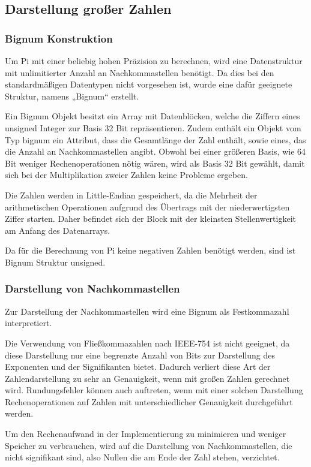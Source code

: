 \documentclass[course=erap]{aspdoc}
\begin{document}
\subsection{Darstellung großer Zahlen}
\subsubsection{Bignum Konstruktion}
Um Pi mit einer beliebig hohen Präzision zu berechnen, wird eine Datenstruktur mit unlimitierter Anzahl an Nachkommastellen benötigt. Da dies bei den standardmäßigen Datentypen nicht vorgesehen ist, wurde eine dafür geeignete Struktur, namens „Bignum“ erstellt.

Ein Bignum Objekt besitzt ein Array mit Datenblöcken, welche die Ziffern eines unsigned Integer zur Basis 32 Bit repräsentieren. Zudem enthält ein Objekt vom Typ bignum ein Attribut, dass die Gesamtlänge der Zahl enthält, sowie eines, das die Anzahl an Nachkommastellen angibt.
Obwohl bei einer größeren Basis, wie 64 Bit weniger Rechenoperationen nötig wären, wird als Basis 32 Bit gewählt, damit sich bei der Multiplikation zweier Zahlen keine Probleme ergeben. %

Die Zahlen werden in Little-Endian gespeichert, da die Mehrheit der arithmetischen Operationen aufgrund des Übertrags mit der niederwertigsten Ziffer starten. Daher befindet sich der Block mit der kleinsten Stellenwertigkeit am Anfang des Datenarrays.

Da für die Berechnung von Pi keine negativen Zahlen benötigt werden, sind ist Bignum Struktur unsigned.

\subsubsection{Darstellung von Nachkommastellen}
Zur Darstellung der Nachkommastellen wird eine Bignum als Festkommazahl interpretiert.

Die Verwendung von Fließkommazahlen nach IEEE-754 ist nicht geeignet, da diese Darstellung nur eine begrenzte Anzahl von Bits zur Darstellung des Exponenten und der Signifikanten bietet. Dadurch verliert diese Art der Zahlendarstellung zu sehr an Genauigkeit, wenn mit großen Zahlen gerechnet wird. Rundungsfehler können auch auftreten, wenn mit einer solchen Darstellung Rechenoperationen auf Zahlen mit unterschiedlicher Genauigkeit durchgeführt werden.\newline

Um den Rechenaufwand in der Implementierung zu minimieren und weniger Speicher zu verbrauchen, wird auf die Darstellung von Nachkommastellen, die nicht signifikant sind, also Nullen die am Ende der Zahl stehen, verzichtet. 
\end{document}
